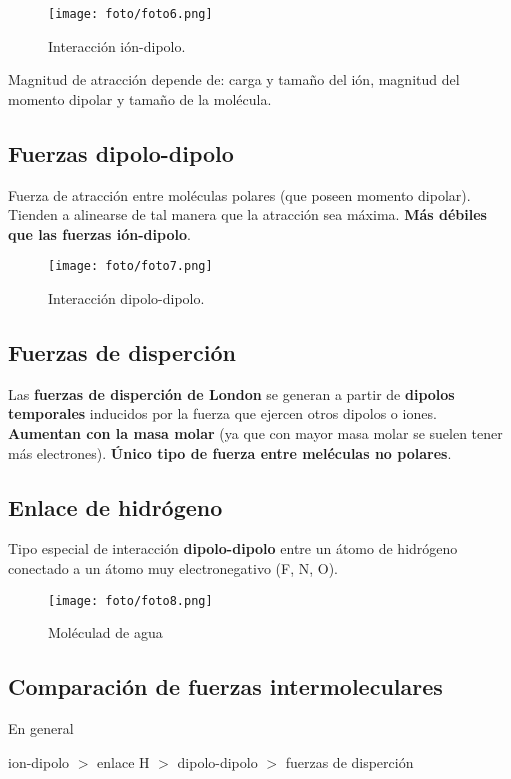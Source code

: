 \documentclass[]{article}
\begin{document}
\begin{figure}[H]
\center
\texttt{[image: foto/foto6.png]}
\caption{Interacción ión-dipolo.}
\end{figure}
 
Magnitud de atracción depende de: carga y tamaño del ión, magnitud del momento dipolar y tamaño de la molécula.



\subsection{Fuerzas dipolo-dipolo}
Fuerza de atracción entre moléculas polares (que poseen momento dipolar). Tienden a alinearse de tal manera que la atracción sea máxima. \textbf{Más débiles que las fuerzas ión-dipolo}.

\begin{figure}[H]
\center
\texttt{[image: foto/foto7.png]}
\caption{Interacción dipolo-dipolo.}
\end{figure}
 
\subsection{Fuerzas de disperción}
Las \textbf{fuerzas de disperción de London} se generan a partir de \textbf{dipolos temporales} inducidos por la fuerza que ejercen otros dipolos o iones. \textbf{Aumentan con la masa molar} (ya que con mayor masa molar se suelen tener más electrones). \textbf{Único tipo de fuerza entre meléculas no polares}.



\subsection{Enlace de hidrógeno}
Tipo especial de interacción \textbf{dipolo-dipolo} entre un átomo de hidrógeno conectado a un átomo muy electronegativo (F, N, O).

\begin{figure}[H]
\center
\texttt{[image: foto/foto8.png]}
\caption{Moléculad de agua}
\end{figure}



\subsection{Comparación de fuerzas intermoleculares} 
En general

\begin{center}
ion-dipolo $>$ enlace H $>$ dipolo-dipolo $>$ fuerzas de disperción 
\end{center}
\end{document}
